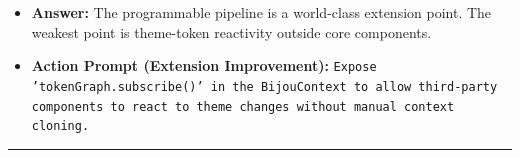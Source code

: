\begin{itemize}
  \begin{itemize}
  \tightlist
  \item
    \textbf{Answer:} The programmable pipeline is a world-class extension point. The weakest point is theme-token reactivity outside core components.
  \item
    \textbf{Action Prompt (Extension Improvement):} \texttt{E\allowbreak{}x\allowbreak{}p\allowbreak{}o\allowbreak{}s\allowbreak{}e\allowbreak{} \allowbreak{}'\allowbreak{}t\allowbreak{}o\allowbreak{}k\allowbreak{}e\allowbreak{}n\allowbreak{}G\allowbreak{}r\allowbreak{}a\allowbreak{}p\allowbreak{}h\allowbreak{}.\allowbreak{}s\allowbreak{}u\allowbreak{}b\allowbreak{}s\allowbreak{}c\allowbreak{}r\allowbreak{}i\allowbreak{}b\allowbreak{}e\allowbreak{}(\allowbreak{})\allowbreak{}'\allowbreak{} \allowbreak{}i\allowbreak{}n\allowbreak{} \allowbreak{}t\allowbreak{}h\allowbreak{}e\allowbreak{} \allowbreak{}B\allowbreak{}i\allowbreak{}j\allowbreak{}o\allowbreak{}u\allowbreak{}C\allowbreak{}o\allowbreak{}n\allowbreak{}t\allowbreak{}e\allowbreak{}x\allowbreak{}t\allowbreak{} \allowbreak{}t\allowbreak{}o\allowbreak{} \allowbreak{}a\allowbreak{}l\allowbreak{}l\allowbreak{}o\allowbreak{}w\allowbreak{} \allowbreak{}t\allowbreak{}h\allowbreak{}i\allowbreak{}r\allowbreak{}d\allowbreak{}-\allowbreak{}p\allowbreak{}a\allowbreak{}r\allowbreak{}t\allowbreak{}y\allowbreak{} \allowbreak{}c\allowbreak{}o\allowbreak{}m\allowbreak{}p\allowbreak{}o\allowbreak{}n\allowbreak{}e\allowbreak{}n\allowbreak{}t\allowbreak{}s\allowbreak{} \allowbreak{}t\allowbreak{}o\allowbreak{} \allowbreak{}r\allowbreak{}e\allowbreak{}a\allowbreak{}c\allowbreak{}t\allowbreak{} \allowbreak{}t\allowbreak{}o\allowbreak{} \allowbreak{}t\allowbreak{}h\allowbreak{}e\allowbreak{}m\allowbreak{}e\allowbreak{} \allowbreak{}c\allowbreak{}h\allowbreak{}a\allowbreak{}n\allowbreak{}g\allowbreak{}e\allowbreak{}s\allowbreak{} \allowbreak{}w\allowbreak{}i\allowbreak{}t\allowbreak{}h\allowbreak{}o\allowbreak{}u\allowbreak{}t\allowbreak{} \allowbreak{}m\allowbreak{}a\allowbreak{}n\allowbreak{}u\allowbreak{}a\allowbreak{}l\allowbreak{} \allowbreak{}c\allowbreak{}o\allowbreak{}n\allowbreak{}t\allowbreak{}e\allowbreak{}x\allowbreak{}t\allowbreak{} \allowbreak{}c\allowbreak{}l\allowbreak{}o\allowbreak{}n\allowbreak{}i\allowbreak{}n\allowbreak{}g\allowbreak{}.}
  \end{itemize}
\end{itemize}

\begin{center}\rule{0.5\linewidth}{0.5pt}\end{center}

